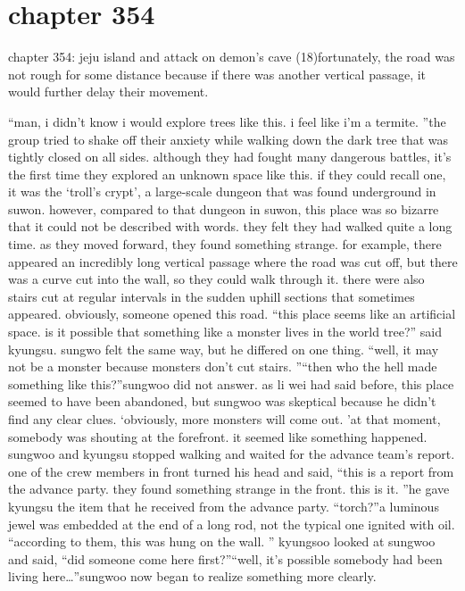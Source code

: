 \section{chapter 354}

chapter 354: jeju island and attack on demon’s cave (18)fortunately, the road was not rough for some distance because if there was another vertical passage, it would further delay their movement.





“man, i didn’t know i would explore trees like this.
 i feel like i’m a termite.
”the group tried to shake off their anxiety while walking down the dark tree that was tightly closed on all sides.
 although they had fought many dangerous battles, it’s the first time they explored an unknown space like this.
 if they could recall one, it was the ‘troll’s crypt’, a large-scale dungeon that was found underground in suwon.
however, compared to that dungeon in suwon, this place was so bizarre that it could not be described with words.
they felt they had walked quite a long time.
 as they moved forward, they found something strange.
 for example, there appeared an incredibly long vertical passage where the road was cut off, but there was a curve cut into the wall, so they could walk through it.
there were also stairs cut at regular intervals in the sudden uphill sections that sometimes appeared.
 obviously, someone opened this road.
“this place seems like an artificial space.
 is it possible that something like a monster lives in the world tree?” said kyungsu.
sungwo felt the same way, but he differed on one thing.
“well, it may not be a monster because monsters don’t cut stairs.
”“then who the hell made something like this?”sungwoo did not answer.
 as li wei had said before, this place seemed to have been abandoned, but sungwoo was skeptical because he didn’t find any clear clues.
‘obviously, more monsters will come out.
’at that moment, somebody was shouting at the forefront.
 it seemed like something happened.
 sungwoo and kyungsu stopped walking and waited for the advance team’s report.
one of the crew members in front turned his head and said, “this is a report from the advance party.
 they found something strange in the front.
 this is it.
”he gave kyungsu the item that he received from the advance party.
“torch?”a luminous jewel was embedded at the end of a long rod, not the typical one ignited with oil.
“according to them, this was hung on the wall.
”
kyungsoo looked at sungwoo and said, “did someone come here first?”“well, it’s possible somebody had been living here…”sungwoo now began to realize something more clearly.
